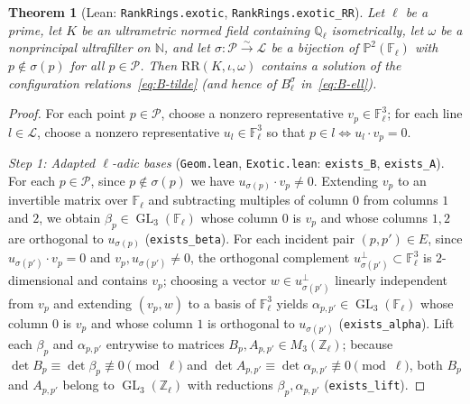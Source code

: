 \documentclass[11pt]{article}
\newtheorem{theorem}{Theorem}[section]
\theoremstyle{definition}
\theoremstyle{remark}
\numberwithin{equation}{section}
\DeclareMathOperator{\GL}{GL}
\newcommand{\RR}{\mathrm{RR}}
\newcommand{\Q}{\mathbb{Q}}
\newcommand{\Z}{\mathbb{Z}}
\newcommand{\N}{\mathbb{N}}
\newcommand{\F}{\mathbb{F}}
\newcommand{\PP}{\mathcal{P}}
\newcommand{\LL}{\mathcal{L}}
\newcommand{\1}{\mathbf{1}}
\newcommand{\code}[1]{{\normalfont\small\texttt{#1}}}
\begin{document}
\begin{theorem}[Lean: \code{RankRings.exotic}, \code{RankRings.exotic\_RR}]
\label{thm:exotic}
Let $\ell$ be a prime, let $K$ be an ultrametric normed field containing $\Q_\ell$ isometrically, let $\omega$ be a nonprincipal ultrafilter on $\N$, and let $\sigma\colon \PP \xrightarrow{\sim} \LL$ be a bijection of $\mathbb{P}^2(\F_\ell)$ with $p \notin \sigma(p)$ for all $p \in \PP$. Then $\RR(K, \iota, \omega)$ contains a solution of the configuration relations~\eqref{eq:B-tilde} (and hence of $B_\ell^\sigma$ in~\eqref{eq:B-ell}).
\end{theorem}

\begin{proof}
For each point $p \in \PP$, choose a nonzero representative $v_p \in \F_\ell^3$; for each line $l \in \LL$, choose a nonzero representative $u_l \in \F_\ell^3$ so that $p \in l \iff u_l \cdot v_p = 0$.

\emph{Step 1: Adapted $\ell$-adic bases} (\code{Geom.lean}, \code{Exotic.lean}: \code{exists\_B}, \code{exists\_A}).
For each $p \in \PP$, since $p \notin \sigma(p)$ we have $u_{\sigma(p)} \cdot v_p \neq 0$. Extending $v_p$ to an invertible matrix over $\F_\ell$ and subtracting multiples of column $0$ from columns $1$ and $2$, we obtain $\beta_p \in \GL_3(\F_\ell)$ whose column $0$ is $v_p$ and whose columns $1, 2$ are orthogonal to $u_{\sigma(p)}$ (\code{exists\_beta}). For each incident pair $(p, p') \in E$, since $u_{\sigma(p')} \cdot v_p = 0$ and $v_p, u_{\sigma(p')} \neq 0$, the orthogonal complement $u_{\sigma(p')}^\perp \subset \F_\ell^3$ is $2$-dimensional and contains $v_p$; choosing a vector $w \in u_{\sigma(p')}^\perp$ linearly independent from $v_p$ and extending $(v_p, w)$ to a basis of $\F_\ell^3$ yields $\alpha_{p, p'} \in \GL_3(\F_\ell)$ whose column $0$ is $v_p$ and whose column $1$ is orthogonal to $u_{\sigma(p')}$ (\code{exists\_alpha}). Lift each $\beta_p$ and $\alpha_{p,p'}$ entrywise to matrices $B_p, A_{p,p'} \in M_3(\Z_\ell)$; because $\det B_p \equiv \det \beta_p \not\equiv 0 \pmod \ell$ and $\det A_{p,p'} \equiv \det \alpha_{p,p'} \not\equiv 0 \pmod \ell$, both $B_p$ and $A_{p,p'}$ belong to $\GL_3(\Z_\ell)$ with reductions $\beta_p, \alpha_{p,p'}$ (\code{exists\_lift}).


\end{proof}
\end{document}
